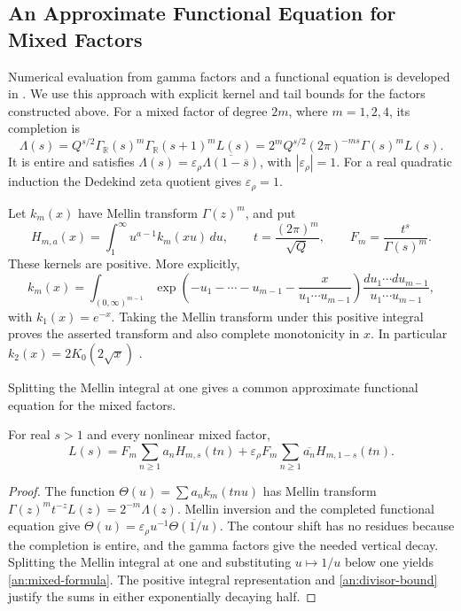 \subsection{An Approximate Functional Equation for Mixed Factors}
\label{an:mixed-afe}

Numerical evaluation from gamma factors and a functional equation is
developed in \cite{Dokchitser2004}. We use this approach with explicit
kernel and tail bounds for the factors constructed above.
For a mixed factor of degree $2m$, where $m=1,2,4$, its completion is
\[
 \Lambda(s)=Q^{s/2}\Gamma_{\mathbb R}(s)^m
                    \Gamma_{\mathbb R}(s+1)^m L(s)
 =2^m Q^{s/2}(2\pi)^{-ms}\Gamma(s)^mL(s).
\]
It is entire and satisfies
$\Lambda(s)=\varepsilon_\rho\overline{\Lambda(1-\overline s)}$,
with $|\varepsilon_\rho|=1$. For a real quadratic induction the
Dedekind zeta quotient gives $\varepsilon_\rho=1$.

Let $k_m(x)$ have Mellin transform $\Gamma(z)^m$, and put
\[
 H_{m,a}(x)=\int_1^\infty u^{a-1}k_m(xu)\,du,\qquad
 t=\frac{(2\pi)^m}{\sqrt Q},\qquad
 F_m=\frac{t^s}{\Gamma(s)^m}.
\]
These kernels are positive. More explicitly,
\begin{equation}\label{an:positive-kernel}
 k_m(x)=\int_{(0,\infty)^{m-1}}
 \exp\left(-u_1-\cdots-u_{m-1}-\frac{x}{u_1\cdots u_{m-1}}\right)
                  \frac{du_1\cdots du_{m-1}}{u_1\cdots u_{m-1}},
\end{equation}
with $k_1(x)=e^{-x}$. Taking the Mellin transform under this positive
integral proves the asserted transform and also complete monotonicity
in $x$. In particular $k_2(x)=2K_0(2\sqrt x)$
\cite[10.32.10, 10.43.19]{DLMF}.

Splitting the Mellin integral at one gives a common approximate
functional equation for the mixed factors.
\begin{lemma}\label{an:balanced-afe}
For real $s>1$ and every nonlinear mixed factor,
\begin{equation}\label{an:mixed-formula}
 L(s)=F_m\sum_{n\geq1}a_nH_{m,s}(tn)
 +\varepsilon_\rho F_m\sum_{n\geq1}\overline{a_n}
                                      H_{m,1-s}(tn).
\end{equation}
\end{lemma}
\begin{proof}
The function $\Theta(u)=\sum a_n k_m(tnu)$ has Mellin transform
$\Gamma(z)^m t^{-z}L(z)=2^{-m}\Lambda(z)$. Mellin inversion and
the completed functional equation give
$\Theta(u)=\varepsilon_\rho u^{-1}\overline{\Theta(1/u)}$.
The contour shift has no residues because the completion is entire,
and the gamma factors give the needed vertical decay. Splitting the Mellin
integral at one and substituting $u\mapsto1/u$ below one yields
\eqref{an:mixed-formula}. The positive integral representation and
\eqref{an:divisor-bound} justify the sums in either exponentially
decaying half.
\end{proof}

